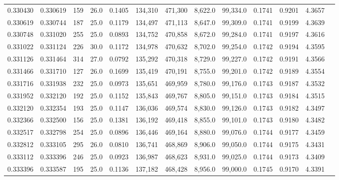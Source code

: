 \begin{tabular}{rrrrrrrrrrrrr}
0.330430 & 0.330619 &   159 & 26.0 &                                     0.1405 & 134,310 & 471,300 &   8,622.0 &  99,334.0 & 0.1741 & 0.9201 & 4.3657 \\
0.330619 & 0.330744 &   187 & 25.0 &                                     0.1179 & 134,497 & 471,113 &   8,647.0 &  99,309.0 & 0.1741 & 0.9199 & 4.3639 \\
0.330748 & 0.331020 &   255 & 25.0 &                                     0.0893 & 134,752 & 470,858 &   8,672.0 &  99,284.0 & 0.1741 & 0.9197 & 4.3616 \\
0.331022 & 0.331124 &   226 & 30.0 &                                     0.1172 & 134,978 & 470,632 &   8,702.0 &  99,254.0 & 0.1742 & 0.9194 & 4.3595 \\
0.331126 & 0.331464 &   314 & 27.0 &                                     0.0792 & 135,292 & 470,318 &   8,729.0 &  99,227.0 & 0.1742 & 0.9191 & 4.3566 \\
0.331466 & 0.331710 &   127 & 26.0 &                                     0.1699 & 135,419 & 470,191 &   8,755.0 &  99,201.0 & 0.1742 & 0.9189 & 4.3554 \\
0.331716 & 0.331938 &   232 & 25.0 &                                     0.0973 & 135,651 & 469,959 &   8,780.0 &  99,176.0 & 0.1743 & 0.9187 & 4.3532 \\
0.331952 & 0.332120 &   192 & 25.0 &                                     0.1152 & 135,843 & 469,767 &   8,805.0 &  99,151.0 & 0.1743 & 0.9184 & 4.3515 \\
0.332120 & 0.332354 &   193 & 25.0 &                                     0.1147 & 136,036 & 469,574 &   8,830.0 &  99,126.0 & 0.1743 & 0.9182 & 4.3497 \\
0.332366 & 0.332500 &   156 & 25.0 &                                     0.1381 & 136,192 & 469,418 &   8,855.0 &  99,101.0 & 0.1743 & 0.9180 & 4.3482 \\
0.332517 & 0.332798 &   254 & 25.0 &                                     0.0896 & 136,446 & 469,164 &   8,880.0 &  99,076.0 & 0.1744 & 0.9177 & 4.3459 \\
0.332812 & 0.333105 &   295 & 26.0 &                                     0.0810 & 136,741 & 468,869 &   8,906.0 &  99,050.0 & 0.1744 & 0.9175 & 4.3431 \\
0.333112 & 0.333396 &   246 & 25.0 &                                     0.0923 & 136,987 & 468,623 &   8,931.0 &  99,025.0 & 0.1744 & 0.9173 & 4.3409 \\
0.333396 & 0.333587 &   195 & 25.0 &                                     0.1136 & 137,182 & 468,428 &   8,956.0 &  99,000.0 & 0.1745 & 0.9170 & 4.3391 \\

\end{tabular}
